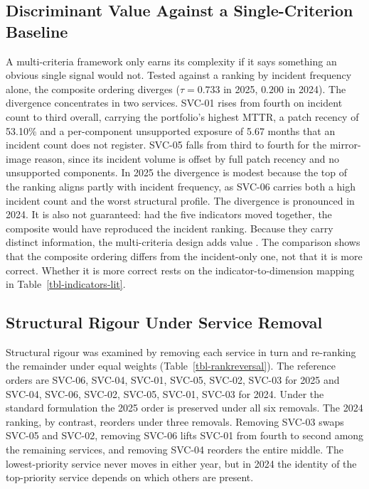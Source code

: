 \documentclass[
  journal,
]{IEEEtran}%
\begin{document}
\subsection{Discriminant Value Against a Single-Criterion
Baseline}\label{sec-discriminant}

A multi-criteria framework only earns its complexity if it says
something an obvious single signal would not. Tested against a ranking
by incident frequency alone, the composite ordering diverges
(\(\tau = 0.733\) in 2025, \(0.200\) in 2024). The divergence
concentrates in two services. SVC-01 rises from fourth on incident count
to third overall, carrying the portfolio's highest MTTR, a patch recency
of 53.10\% and a per-component unsupported exposure of 5.67 months that
an incident count does not register. SVC-05 falls from third to fourth
for the mirror-image reason, since its incident volume is offset by full
patch recency and no unsupported components. In 2025 the divergence is
modest because the top of the ranking aligns partly with incident
frequency, as SVC-06 carries both a high incident count and the worst
structural profile. The divergence is pronounced in 2024. It is also not
guaranteed: had the five indicators moved together, the composite would
have reproduced the incident ranking. Because they carry distinct
information, the multi-criteria design adds value
. The
comparison shows that the composite ordering differs from the
incident-only one, not that it is more correct. Whether it is more
correct rests on the indicator-to-dimension mapping in
Table~\ref{tbl-indicators-lit}.

\subsection{Structural Rigour Under Service
Removal}\label{sec-rankreversal}

Structural rigour was examined by removing each service in turn and
re-ranking the remainder under equal weights
(Table~\ref{tbl-rankreversal}). The reference orders are SVC-06, SVC-04,
SVC-01, SVC-05, SVC-02, SVC-03 for 2025 and SVC-04, SVC-06, SVC-02,
SVC-05, SVC-01, SVC-03 for 2024. Under the standard formulation the 2025
order is preserved under all six removals. The 2024 ranking, by
contrast, reorders under three removals. Removing SVC-03 swaps SVC-05
and SVC-02, removing SVC-06 lifts SVC-01 from fourth to second among the
remaining services, and removing SVC-04 reorders the entire middle. The
lowest-priority service never moves in either year, but in 2024 the
identity of the top-priority service depends on which others are
present.
\end{document}
